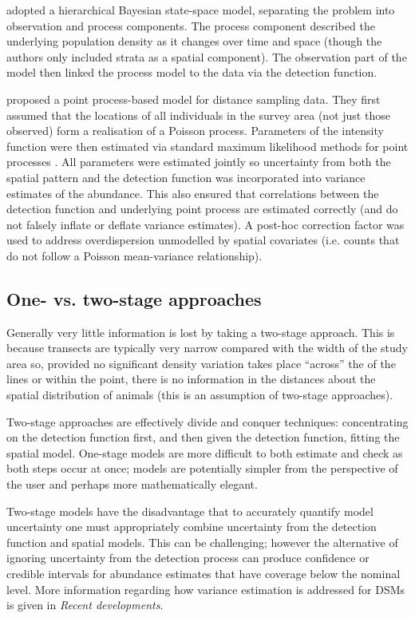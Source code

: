 \documentclass[a4paper,12pt]{article}
\begin{document}
\cite{Moore:2011jf} adopted a hierarchical Bayesian state-space model, separating the problem into observation and process components. The process component described the underlying population density as it changes over time and space (though the authors only included strata as a spatial component). The observation part of the model then linked the process model to the data via the detection function. 

\cite{Johnson:2010gf} proposed a point process-based model for distance sampling data. They first assumed that the locations of all individuals in the survey area (not just those observed) form a realisation of a Poisson process. Parameters of the intensity function were then estimated via standard maximum likelihood methods for point processes \citep{Baddeley:2000to}. All parameters were estimated jointly so uncertainty from both the spatial pattern and the detection function was incorporated into variance estimates of the abundance. This also ensured that correlations between the detection function and underlying point process are estimated correctly (and do not falsely inflate or deflate variance estimates). A post-hoc correction factor was used to address overdispersion unmodelled by spatial covariates (i.e. counts that do not follow a Poisson mean-variance relationship).

\subsection*{One- vs. two-stage approaches}

Generally very little information is lost by taking a two-stage approach. This is because transects are typically very narrow compared with the width of the study area so, provided no significant density variation takes place ``across'' the of the lines or within the point, there is no information in the distances about the spatial distribution of animals (this is an assumption of two-stage approaches). 

Two-stage approaches are effectively divide and conquer techniques: concentrating on the detection function first, and then given the detection function, fitting the spatial model. One-stage models are more difficult to both estimate and check as both steps occur at once; models are potentially simpler from the perspective of the user and perhaps more mathematically elegant.

 Two-stage models have the disadvantage that to accurately quantify model uncertainty one must appropriately combine uncertainty from the detection function and spatial models. This can be challenging; however the alternative of ignoring uncertainty from the detection process \cite[e.g.][]{Niemi:2010kx} can produce confidence or credible intervals for abundance estimates that have coverage below the nominal level. More information regarding how variance estimation is addressed for DSMs is given in \textit{Recent developments}.
\end{document}
